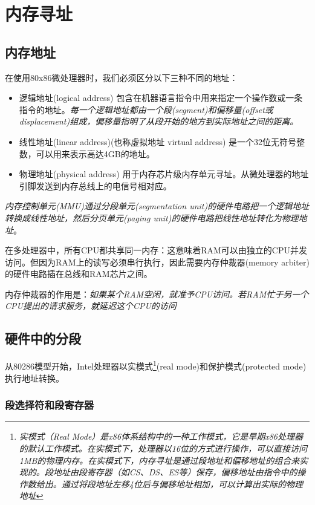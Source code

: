 \chapter{内存寻址}

\section{内存地址}

    在使用80x86微处理器时，我们必须区分以下三种不同的地址：

\begin{itemize}
    \item 逻辑地址(logical address)
    \subitem 包含在机器语言指令中用来指定一个操作数或一条指令的地址。\emph{每一个逻辑地址都由一个段(segment)和偏移量(offset或displacement)组成，偏移量指明了从段开始的地方到实际地址之间的距离。}
    \item 线性地址(linear address)(也称虚拟地址 virtual address)
    \subitem 是一个32位无符号整数，可以用来表示高达4GB的地址。
    \item 物理地址(physical address)
    \subitem 用于内存芯片级内存单元寻址。从微处理器的地址引脚发送到内存总线上的电信号相对应。
\end{itemize}

    \emph{内存控制单元(MMU)通过分段单元(segmentation unit)的硬件电路把一个逻辑地址转换成线性地址，然后分页单元(paging unit)的硬件电路把线性地址转化为物理地址}。

    在多处理器中，所有CPU都共享同一内存：这意味着RAM可以由独立的CPU并发访问。但因为RAM上的读写必须串行执行，因此需要内存仲裁器(memory arbiter)的硬件电路插在总线和RAM芯片之间。

    内存仲裁器的作用是：\emph{如果某个RAM空闲，就准予CPU访问。若RAM忙于另一个CPU提出的请求服务，就延迟这个CPU的访问}

\section{硬件中的分段}

    从80286模型开始，Intel处理器以实模式\footnote[1]{\emph{实模式（Real Mode）是x86体系结构中的一种工作模式，它是早期x86处理器的默认工作模式。在实模式下，处理器以16位的方式进行操作，可以直接访问1MB的物理内存。在实模式下，内存寻址是通过段地址和偏移地址的组合来实现的。段地址由段寄存器（如CS、DS、ES等）保存，偏移地址由指令中的操作数给出。通过将段地址左移4位后与偏移地址相加，可以计算出实际的物理地址}}(real mode)和保护模式(protected mode)执行地址转换。

\subsection{段选择符和段寄存器}

